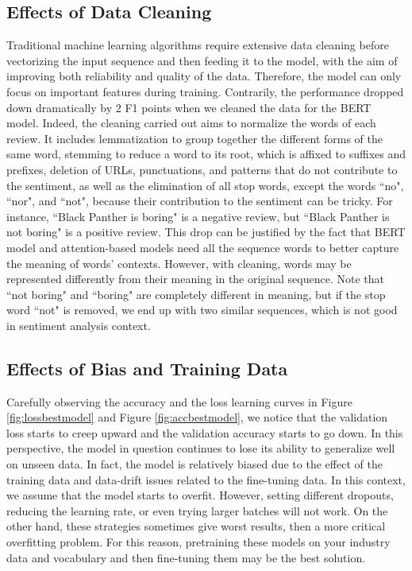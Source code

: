 \documentclass{article}
\begin{document}
\subsection{Effects of Data Cleaning} 
Traditional machine learning algorithms require extensive data cleaning before vectorizing the input sequence and then feeding it to the model, with the aim of improving both reliability and quality of the data. Therefore, the model can only focus on important features during training. Contrarily, the performance dropped down dramatically by 2 F1 points when we cleaned the data for the BERT model. Indeed, the cleaning carried out aims to normalize the words of each review. It includes lemmatization to group together the different forms of the same word, stemming to reduce a word to its root, which is affixed to suffixes and prefixes, deletion of URLs, punctuations, and patterns that do not contribute to the sentiment, as well as the elimination of all stop words, except the words ``no", ``nor", and ``not", because their contribution to the sentiment can be tricky. For instance, ``Black Panther is boring" is a negative review, but ``Black Panther is not boring" is a positive review. This drop can be justified by the fact that BERT model and attention-based models need all the sequence words to better capture the meaning of words' contexts. However, with cleaning, words may be represented differently from their meaning in the original sequence. Note that ``not boring" and ``boring" are completely different in meaning, but if the stop word ``not" is removed, we end up with two similar sequences, which is not good in sentiment analysis context.

\subsection{Effects of Bias and Training Data} 
Carefully observing the accuracy and the loss learning curves in Figure \ref{fig:lossbestmodel} and Figure \ref{fig:accbestmodel}, we notice that the validation loss starts to creep upward and the validation accuracy starts to go down. In this perspective, the model in question continues to lose its ability to generalize well on unseen data. In fact, the model is relatively biased due to the effect of the training data and data-drift issues related to the fine-tuning data. In this context, we assume that the model starts to overfit. However, setting different dropouts, reducing the learning rate, or even trying larger batches will not work. On the other hand, these strategies sometimes give worst results, then a more critical overfitting problem. For this reason, pretraining these models on your industry data and vocabulary and then fine-tuning them may be the best solution.
\end{document}
